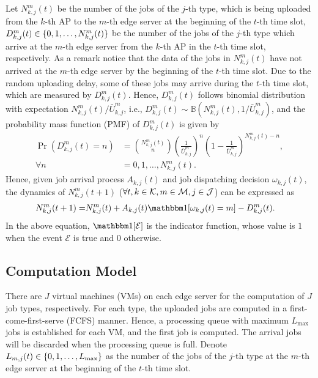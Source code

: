 Let $N_{k,j}^m(t)$ be the number of the jobs of the $j$-th type, which is being uploaded from the $k$-th AP to the $m$-th edge server at the beginning of the $t$-th time slot, $D_{k,j}^m(t)\in\{0,1,\dots,N_{k,j}^m(t)\}$ be the number of the jobs of the $j$-th type which arrive at the $m$-th edge server from the $k$-th AP in the $t$-th time slot, respectively.
As a remark notice that the data of the jobs in $N_{k,j}^m(t)$ have not arrived at the $m$-th edge server by the beginning of the $t$-th time slot. Due to the random uploading delay, some of these jobs may arrive during the $t$-th time slot, which are measured by $D_{k,j}^m(t)$. Hence, $D_{k,j}^m(t)$ follows binomial distribution with expectation $N_{k,j}^m(t)/\bar{U}_{k,j}^{m}$, i.e., $D_{k,j}^m(t)\sim \mathbb{B}(N_{k,j}^m(t),1/\bar{U}_{k,j}^{m})$,
and the probability mass function (PMF) of $D_{k,j}^m(t)$ is given by
\begin{align}
\Pr\left(D_{k,j}^m(t)=n\right)&=\binom{N_{k,j}^m(t)}{n}\left(\frac{1}{\bar{U}_{k,j}^{m}}\right)^n\left(1-\frac{1}{\bar{U}_{k,j}^{m}}\right)^{N_{k,j}^m(t)-n}, \nonumber\\ 
\forall n&=0,1,\dots,
N_{k,j}^m(t).
\end{align}
Hence, given job arrival process $A_{k,j}(t)$ and job dispatching decision $\omega_{k,j}(t)$,  the dynamics of $N_{k,j}^m(t+1)$ ($\forall t, k\in \mathcal{K}, m\in \mathcal{M}, j \in \mathcal{J}$)  can be expressed as
\begin{align}
N_{k,j}^m(t+1)=&N_{k,j}^m(t)+A_{k,j}(t)\indicator[\omega_{k,j}(t)=m]-D_{k,j}^m(t).
\end{align}
In the above equation, $\indicator[\mathcal{E}]$ is the indicator function, whose value is $1$ when the event $\mathcal{E}$ is true and $0$ otherwise.

\subsection{Computation Model}
There are $J$ virtual machines (VMs) on each edge server for the computation of $J$ job types, respectively. For each type, the uploaded jobs are computed in a first-come-first-serve (FCFS) manner.
Hence, a processing queue with maximum $L_{\max}$ jobs is established for each VM, and the first job is computed. The arrival jobs will be discarded when the processing queue is full.
Denote $L_{m,j}(t)\in\{0,1,\dots,L_{{\max}}\}$ as the number of the jobs of the $j$-th type at the $m$-th edge server at the beginning of the $t$-th time slot.

